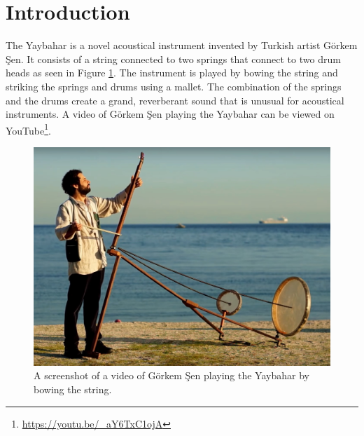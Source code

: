 \documentclass{article}
\title{\papertitle}
\begin{document}
%
\capstartfalse
\maketitle
\capstarttrue
%
\begin{abstract}
In this paper, finite difference schemes (FDSs) are adopted to model a specific instrument, the Yaybahar, invented by Turkish artist Görkem Şen.
Each part of the instrument is simulated independently and its physical behavior is explained in an intuitive yet accurate manner. 
The models are implemented in C++ to form an interactive, real-time application, whose architecture and optimization are discussed.
\end{abstract}
%

\section{Introduction}\label{sec:introduction}
\nocite{Someone:00}

The Yaybahar is a novel acoustical instrument invented by Turkish artist Görkem Şen. It consists of a string connected to two springs that connect to two drum heads as seen in Figure \ref{fig:yaybahar}.
The instrument is played by bowing the string and striking the springs and drums using a mallet.
The combination of the springs and the drums create a grand, reverberant sound that is unusual for acoustical instruments.
A video of Görkem Şen playing the Yaybahar can be viewed on YouTube\footnote{\url{https://youtu.be/_aY6TxC1ojA}\label{fn:videoUrl}}.

\begin{figure}[h]
    \centering
    \includegraphics[width=\linewidth]{yaybahar.jpg}
    \caption{A screenshot of a video 
    of Görkem Şen playing the Yaybahar by bowing the string.}
    \label{fig:yaybahar}
\end{figure}
\end{document}
